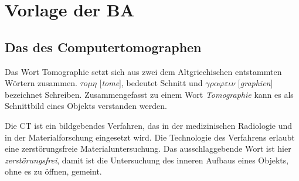 \chapter*{Vorlage der BA}

\section*{Das des Computertomographen}

Das Wort Tomographie setzt sich aus zwei dem Altgriechischen entstammten Wörtern zusammen. $\tau o\mu\eta$ [\textit{tome}], bedeutet Schnitt und $\gamma\rho\alpha\varphi\varepsilon\iota\nu$ [\textit{graphien}] bezeichnet Schreiben. Zusammengefasst zu einem Wort \textit{Tomographie} kann es als Schnittbild eines Objekts verstanden werden. 

Die CT ist ein bildgebendes Verfahren, das in der medizinischen Radiologie und in der Materialforschung eingesetzt wird. Die Technologie des Verfahrens erlaubt eine zerstörungsfreie Materialuntersuchung. Das ausschlaggebende Wort ist hier \textit{zerstörungsfrei}, damit ist die Untersuchung des inneren Aufbaus eines Objekts, ohne es zu öffnen, gemeint. 
